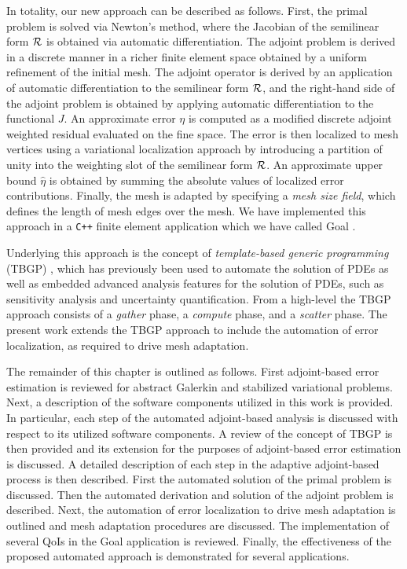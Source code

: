 In totality, our new approach can be described as follows. First, the primal
problem is solved via Newton's method, where the Jacobian of the semilinear
form $\mathcal{R}$ is obtained via automatic differentiation. The adjoint problem is
derived in a discrete manner in a richer finite element space obtained by a
uniform refinement of the initial mesh. The adjoint operator is derived by an
application of automatic differentiation to the semilinear form $\mathcal{R}$, and the
right-hand side of the adjoint problem is obtained by applying automatic
differentiation to the functional $J$. An approximate error $\eta$ is computed
as a modified discrete adjoint weighted residual evaluated on the fine space.
The error is then localized to mesh vertices using a variational localization
approach by introducing a partition of unity into the weighting slot of the semilinear form
$\mathcal{R}$. An approximate upper bound $\hat{\eta}$ is obtained by summing the
absolute values of localized error contributions. Finally, the mesh is adapted
by specifying a \emph{mesh size field}, which defines the length of mesh
edges over the mesh. We have implemented this approach in a \texttt{C++}
finite element application which we have called Goal \cite{goal_github}.

Underlying this approach is the concept of \emph{template-based generic
programming} (TBGP) \cite{pawlowski2012automating1, pawlowski2012automating2},
which has previously been used to automate the solution of PDEs as well as
embedded advanced analysis features for the solution of PDEs, such as
sensitivity analysis and uncertainty quantification. From a high-level the
TBGP approach consists of a \emph{gather} phase, a \emph{compute} phase,
and a \emph{scatter} phase. The present work extends the TBGP approach to
include the automation of error localization, as required to drive
mesh adaptation.

The remainder of this chapter is outlined as follows.
First adjoint-based error estimation is reviewed for abstract
Galerkin and stabilized variational problems.
Next, a description of the software components utilized in this
work is provided. In particular, each step of the automated
adjoint-based analysis is discussed with respect to its utilized software
components. A review of the concept of TBGP is then provided
and its extension for the purposes of adjoint-based error estimation
is discussed. A detailed description of each step in the
adaptive adjoint-based process is then described. First the
automated solution of the primal problem is discussed. Then
the automated derivation and solution of the adjoint problem
is described. Next, the automation of error localization to
drive mesh adaptation is outlined and mesh adaptation procedures
are discussed. The implementation of several QoIs in the Goal
application is reviewed. Finally, the effectiveness of the
proposed automated approach is demonstrated for several
applications.

